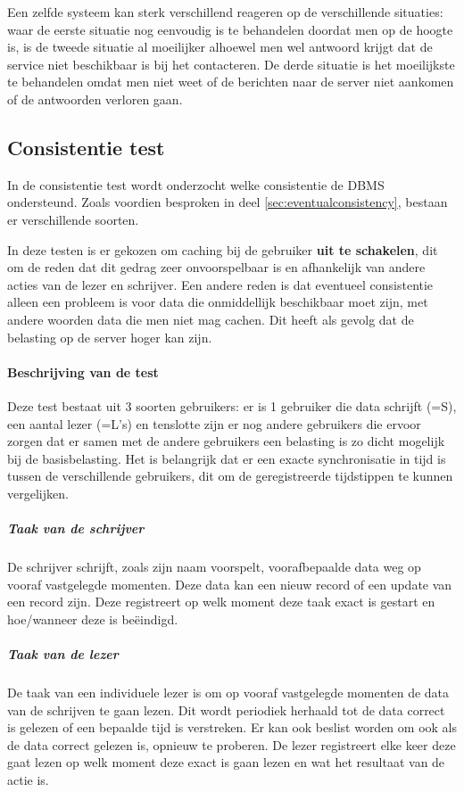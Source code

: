 Een zelfde systeem kan sterk verschillend reageren op de verschillende situaties: waar de eerste situatie nog eenvoudig is te behandelen doordat men op de hoogte is, is de tweede situatie al moeilijker alhoewel men wel antwoord krijgt dat de service niet beschikbaar is bij het contacteren. De derde situatie is het moeilijkste te behandelen omdat men niet weet of de berichten naar de server niet aankomen of de antwoorden verloren gaan. 
 
\subsection{Consistentie test}
In de consistentie test wordt onderzocht welke consistentie de \gls{DBMS} ondersteund. Zoals voordien besproken in deel \ref{sec:eventualconsistency}, bestaan er verschillende soorten. 

In deze testen is er gekozen om caching bij de gebruiker \textbf{uit te schakelen}, dit om de reden dat dit gedrag zeer onvoorspelbaar is en afhankelijk van andere acties van de lezer en schrijver. Een andere reden is dat eventueel consistentie alleen een probleem is voor data die onmiddellijk beschikbaar moet zijn, met andere woorden data die men niet mag cachen. Dit heeft als gevolg dat de belasting op de server hoger kan zijn. 

\paragraph{Beschrijving van de test} Deze test bestaat uit 3 soorten gebruikers: er is 1 gebruiker die data schrijft (=S), een aantal lezer (=L's) en tenslotte zijn er nog andere gebruikers die ervoor zorgen dat er samen met de andere gebruikers een belasting is zo dicht mogelijk bij de basisbelasting. 
Het is belangrijk dat er een exacte synchronisatie in tijd is tussen de verschillende gebruikers, dit om de geregistreerde tijdstippen te kunnen vergelijken.

\subparagraph{Taak van de schrijver} De schrijver schrijft, zoals zijn naam voorspelt, voorafbepaalde data weg op vooraf vastgelegde momenten. Deze data kan een nieuw record of een update van een record zijn. Deze registreert op welk moment deze taak exact is gestart en hoe/wanneer deze is beëindigd.

\subparagraph{Taak van de lezer} De taak van een individuele lezer is om op vooraf vastgelegde momenten de data van de schrijven te gaan lezen. Dit wordt periodiek herhaald tot de data correct is gelezen of een bepaalde tijd is verstreken. Er kan ook beslist worden om ook als de data correct gelezen is, opnieuw te proberen. De lezer registreert elke keer deze gaat lezen op welk moment deze exact is gaan lezen en wat het resultaat van de actie is.  

